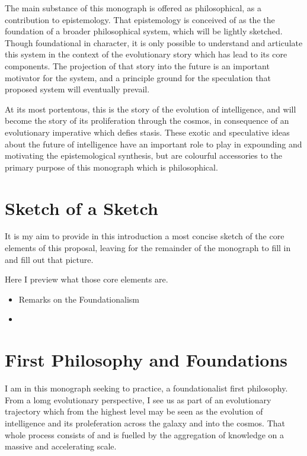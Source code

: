 The main substance of this monograph is offered as philosophical, as a contribution to epistemology.
That epistemology is conceived of as the the foundation of a broader philosophical system, which will be lightly sketched.
Though foundational in character, it is only possible to understand and articulate this system in the context of the evolutionary story which has lead to its core components.
The projection of that story into the future is an important motivator for the system, and a principle ground for the speculation that proposed system will eventually prevail.

At its most portentous, this is the story of the evolution of intelligence, and will become the story of its proliferation through the cosmos, in consequence of an evolutionary imperative which defies stasis.
These exotic and speculative ideas about the future of intelligence have an important role to play in expounding and motivating the epistemological synthesis, but are colourful accessories to the primary purpose of this monograph which is philosophical.

\section{Sketch of a Sketch}

It is my aim to provide in this introduction a most concise sketch of the core elements of this proposal, leaving for the remainder of the monograph to fill in and fill out that picture.

Here I preview what those core elements are.

\begin{itemize}
\item Remarks on the Foundationalism
\item
\end{itemize}

\section{First Philosophy and Foundations}

I am in this monograph seeking to practice, a foundationalist first philosophy.
From a lomg evolutionary perspective, I see us as part of an evolutionary trajectory which from the highest level may be seen as the evolution of intelligence and its proleferation across the galaxy and into the cosmos.
That whole process consists of and is fuelled by the aggregation of knowledge on a massive and accelerating scale.

